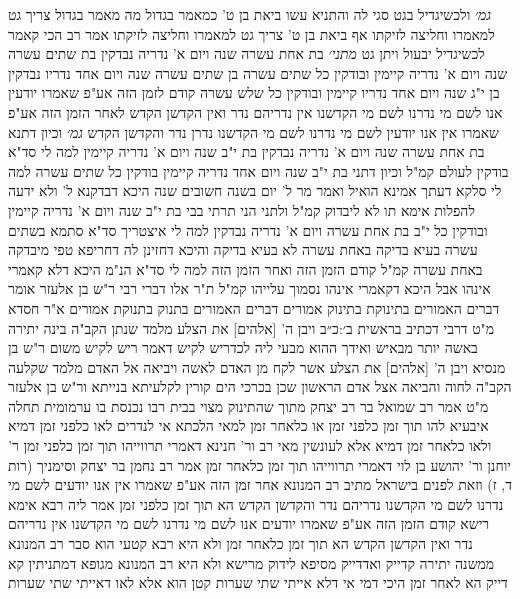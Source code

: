 \documentclass[12pt, openany]{book}
\begin{document}
{{\large\emph{גמ׳}} ולכשיגדיל בגט סגי לה והתניא עשו ביאת בן ט' כמאמר בגדול
מה מאמר בגדול צריך גט למאמרו וחליצה לזיקתו אף ביאת בן ט' צריך גט למאמרו וחליצה לזיקתו 
אמר רב הכי קאמר
לכשיגדיל יבעול ויתן גט
{\large\emph{מתני׳}} בת אחת עשרה שנה ויום א' נדריה נבדקין בת שתים עשרה שנה ויום א' נדריה קיימין ובודקין כל שתים עשרה
בן שתים עשרה שנה ויום אחד נדריו נבדקין בן י"ג שנה ויום אחד נדריו קיימין ובודקין כל שלש עשרה 
קודם לזמן הזה אע"פ שאמרו יודעין אנו לשם מי נדרנו לשם מי הקדשנו אין נדריהם נדר ואין הקדשן הקדש לאחר הזמן הזה אע"פ שאמרו אין אנו יודעין לשם מי נדרנו לשם מי הקדשנו נדרן נדר והקדשן הקדש
{\large\emph{גמ׳}} וכיון דתנא בת אחת עשרה שנה ויום א' נדריה נבדקין בת י"ב שנה ויום א' נדריה קיימין למה לי סד"א בודקין לעולם קמ"ל 
וכיון דתני בת י"ב שנה ויום אחד נדריה קיימין בודקין כל שתים עשרה למה לי סלקא דעתך אמינא הואיל ואמר מר ל' יום בשנה חשובים שנה היכא דבדקנא ל' ולא ידעה להפלות אימא תו לא ליבדוק קמ"ל 
ולתני הני תרתי בבי בת י"ב שנה ויום א' נדריה קיימין ובודקין כל י"ב בת אחת עשרה ויום א' נדריה נבדקין למה לי 
איצטריך סד"א סתמא בשתים עשרה בעיא בדיקה באחת עשרה לא בעיא בדיקה והיכא דחזינן לה דחריפא טפי מיבדקה באחת עשרה קמ"ל 
קודם הזמן הזה ואחר הזמן הזה למה לי סד"א הנ"מ היכא דלא קאמרי אינהו אבל היכא דקאמרי אינהו נסמוך עלייהו קמ"ל 
ת"ר אלו דברי רבי ר"ש בן אלעזר אומר דברים האמורים בתינוקת בתינוק אמורים דברים האמורים בתנוק בתנוקת אמורים 
א"ר חסדא מ"ט דרבי דכתיב {בראשית ב׳:כ״ב } ויבן ה' [אלהים] את הצלע מלמד שנתן הקב"ה בינה יתירה באשה יותר מבאיש 
ואידך ההוא מבעי ליה לכדריש לקיש דאמר ריש לקיש משום ר"ש בן מנסיא ויבן ה' [אלהים] את הצלע אשר לקח מן האדם לאשה ויביאה אל האדם מלמד שקלעה הקב"ה לחוה והביאה אצל אדם הראשון שכן בכרכי הים קורין לקלעיתא בנייתא 
ור"ש בן אלעזר מ"ט אמר רב שמואל בר רב יצחק מתוך שהתינוק מצוי בבית רבו נכנסת בו ערמומית תחלה 
איבעיא להו תוך זמן כלפני זמן או כלאחר זמן 
למאי הלכתא אי לנדרים לאו כלפני זמן דמיא ולאו כלאחר זמן דמיא
אלא לעונשין מאי רב ור' חנינא דאמרי תרווייהו תוך זמן כלפני זמן ר' יוחנן ור' יהושע בן לוי דאמרי תרווייהו תוך זמן כלאחר זמן 
אמר רב נחמן בר יצחק וסימניך (רות ד, ז) וזאת לפנים בישראל 
מתיב רב המנונא אחר זמן הזה אע"פ שאמרו אין אנו יודעים לשם מי נדרנו לשם מי הקדשנו נדריהם נדר והקדשן הקדש הא תוך זמן כלפני זמן 
אמר ליה רבא אימא רישא קודם הזמן הזה אע"פ שאמרו יודעים אנו לשם מי נדרנו לשם מי הקדשנו אין נדריהם נדר ואין הקדשן הקדש הא תוך זמן כלאחר זמן 
ולא היא רבא קטעי הוא סבר רב המנונא ממשנה יתירה קדייק ואדדייק מסיפא לידוק מרישא 
ולא היא רב המנונא מגופא דמתניתין קא דייק הא לאחר זמן היכי דמי אי דלא אייתי שתי שערות קטן הוא אלא לאו דאייתי שתי שערות}
\end{document}

